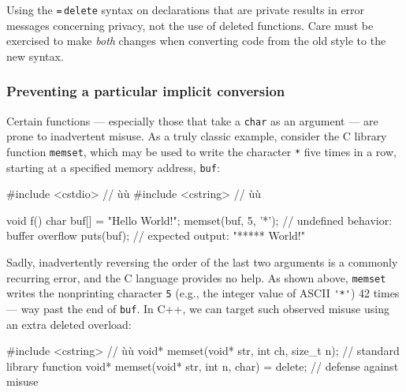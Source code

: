 \noindent Using the \lstinline!=!\,\lstinline!delete! syntax on declarations that are private results in error messages concerning privacy, not the use of deleted functions. Care must be exercised to make \emph{both} changes when converting code from the old style to the new syntax.

\subsubsection[Preventing a particular implicit conversion]{Preventing a particular implicit conversion}\label{preventing-a-particular-implicit-conversion}

Certain functions --- especially those that take a \lstinline!char! as an
argument --- are prone to inadvertent misuse. As a truly classic
example, consider the C library function \lstinline!memset!, which may be used
to write the character \lstinline!*! five times in a row, starting at a
specified memory address, \lstinline!buf!:

%
\begin{emcppslisting}
#include <cstdio>  // ù{}ù
#include <cstring> // ù{}ù

void f()
{
    char buf[] = "Hello World!";
    memset(buf, 5, '*');  // undefined behavior: buffer overflow
    puts(buf);            // expected output: "***** World!"
}
\end{emcppslisting}


\noindent Sadly, inadvertently reversing the order of the last two arguments is a commonly
recurring error, and the C language provides no help. As shown above, \lstinline!memset! writes the nonprinting character \lstinline!5! (e.g., the integer value of ASCII \lstinline!'*'!) 42 times --- way past the end of \lstinline!buf!. In C++, we
can target such observed misuse using an extra deleted overload:

\begin{emcppslisting}
#include <cstring>  // ù{}ù
void* memset(void* str, int ch, size_t n);      // standard library function
void* memset(void* str, int n, char) = delete;  // defense against misuse
\end{emcppslisting}

